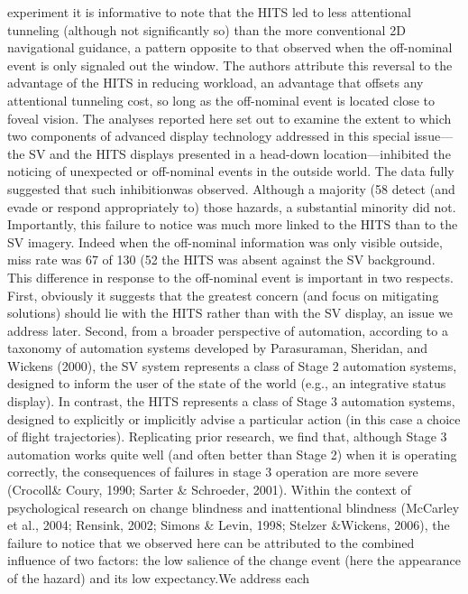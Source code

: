 \documentclass[utf8,bachelor,manualbib]{gradu3}
\begin{document}
experiment it is informative to note that the HITS led to less attentional tunneling
(although not significantly so) than the more conventional 2D navigational guidance,
a pattern opposite to that observed when the off-nominal event is only signaled
out the window. The authors attribute this reversal to the advantage of the
HITS in reducing workload, an advantage that offsets any attentional tunneling
cost, so long as the off-nominal event is located close to foveal vision. The analyses reported here set out to examine the extent to which two components
of advanced display technology addressed in this special issue—the SV and the
HITS displays presented in a head-down location—inhibited the noticing of unexpected
or off-nominal events in the outside world. The data fully suggested that
such inhibitionwas observed. Although a majority (58%
detect (and evade or respond appropriately to) those hazards, a substantial minority
did not. Importantly, this failure to notice was much more linked to the HITS than
to the SV imagery. Indeed when the off-nominal information was only visible outside,
miss rate was 67 of 130 (52%
the HITS was absent against the SV background.
This difference in response to the off-nominal event is important in two
respects. First, obviously it suggests that the greatest concern (and focus on mitigating
solutions) should lie with the HITS rather than with the SV display, an issue
we address later. Second, from a broader perspective of automation, according to a taxonomy of automation systems developed by Parasuraman, Sheridan, and
Wickens (2000), the SV system represents a class of Stage 2 automation systems,
designed to inform the user of the state of the world (e.g., an integrative status display).
In contrast, the HITS represents a class of Stage 3 automation systems, designed
to explicitly or implicitly advise a particular action (in this case a choice of
flight trajectories). Replicating prior research, we find that, although Stage 3 automation
works quite well (and often better than Stage 2) when it is operating correctly,
the consequences of failures in stage 3 operation are more severe (Crocoll\&
Coury, 1990; Sarter \& Schroeder, 2001).
Within the context of psychological research on change blindness and inattentional
blindness (McCarley et al., 2004; Rensink, 2002; Simons \& Levin,
1998; Stelzer \&Wickens, 2006), the failure to notice that we observed here can be
attributed to the combined influence of two factors: the low salience of the change
event (here the appearance of the hazard) and its low expectancy.We address each
\end{document}
